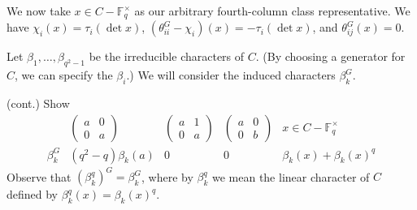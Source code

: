 \documentclass[../Odyssey_Project.tex]{subfiles}
\begin{document}
\noindent We now take $x \in C - \mathbb{F}_q^\times$ as our arbitrary fourth-column class representative. We have $\chi_i(x) = \tau_i(\det x)$, $(\theta_{ii}^G - \chi_i)(x) = -\tau_i(\det x)$, and $\theta_{ij}^G(x) = 0$.

\noindent Let $\beta_1, \dots, \beta_{q^2 - 1}$ be the irreducible characters of $C$. (By choosing a generator for $C$, we can specify the $\beta_i$.) We will consider the induced characters $\beta_k^G$.

\begin{exercise}
\label{ex:16.17}
(cont.) Show
\[
\begin{array}{c|cccc}
 & \begin{pmatrix} a & 0 \\ 0 & a \end{pmatrix} & \begin{pmatrix} a & 1 \\ 0 & a \end{pmatrix} & \begin{pmatrix} a & 0 \\ 0 & b \end{pmatrix} & x \in C - \mathbb{F}_q^\times \\
\hline
\beta_k^G & (q^2 - q) \beta_k(a) & 0 & 0 & \beta_k(x) + \beta_k(x)^q
\end{array}
\]
Observe that $(\beta_k^q)^G = \beta_k^G$, where by $\beta_k^q$ we mean the linear character of $C$ defined by $\beta_k^q(x) = \beta_k(x)^q$.
\end{exercise}
\end{document}
